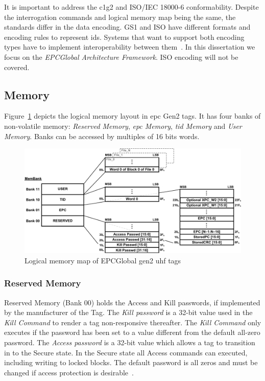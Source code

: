 It is important to address the \ac{c1g2} and ISO/IEC 18000-6 conformability. Despite the interrogation commands and logical memory map being the same, the standards differ in the data encoding. 
GS1 and ISO have different formats and encoding rules to represent \acp{id}.
Systems that want to support both encoding types have to implement interoperability between them~\cite{mizutaniMulticodePortableRFID2016a}.
In this dissertation we focus on the \emph{EPCGlobal Architecture Framework}. ISO encoding will not be covered.

\subsection{Memory}

Figure~\ref{fig:logicalmemorymap} depicts the logical memory layout in \ac{epc} Gen2 tags. It has four banks of non-volatile memory: \emph{Reserved Memory}, \emph{\ac{epc} Memory}, \emph{\ac{tid} Memory} and \emph{User Memory}. Banks can be accessed by multiples of 16 bits words.

\begin{figure}[!ht]
    \centering
    \includegraphics[width=\textwidth]{./figs/02-state-of-the-art/logicmemorymap.pdf}
    \caption{Logical memory map of EPCGlobal \ac{gen2} \ac{uhf} tags~\cite{UHFGen2Tag}} 
    \label{fig:logicalmemorymap}
\end{figure}

\subsubsection{Reserved Memory}

Reserved Memory (Bank $00$) holds the Access and Kill passwords, if implemented by the manufacturer of the Tag. 
The \emph{Kill password} is a 32-bit value used in the \emph{Kill Command} to render a tag non-responsive thereafter. The \emph{Kill Command} only executes if the password has been set to a value different from the default all-zero password.
The \emph{Access password} is a 32-bit value which allows a tag to transition in to the Secure state. In the Secure state all Access commands can executed, including writing to locked blocks. The default password is all zeros and must be changed if access protection is desirable~\cite{RFIDEPCGen2,UHFGen2Tag}.


